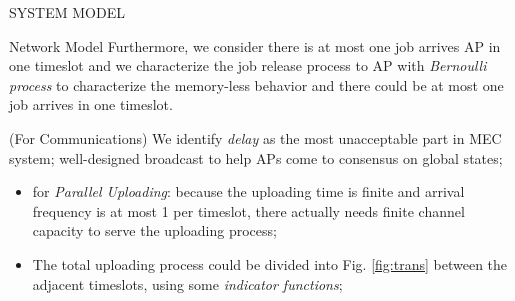 \documentclass[10pt, conference, letterpaper]{IEEEtran}
\begin{document}
\begin{section}{SYSTEM MODEL}
\begin{subsection}{Network Model}
            Furthermore, we consider there is at most one job arrives AP in one timeslot and we characterize the job release process to AP with \emph{Bernoulli process} to characterize the memory-less behavior and there could be at most one job arrives in one timeslot.

            (For Communications) We identify \emph{delay} as the most unacceptable part in MEC system; well-designed broadcast to help APs come to consensus on global states;
            \begin{itemize}
                \item for \emph{Parallel Uploading}: because the uploading time is finite and arrival frequency is at most 1 per timeslot, there actually needs finite channel capacity to serve the uploading process;
                \item The total uploading process could be divided into Fig. \ref{fig:trans} between the adjacent timeslots, using some \emph{indicator functions};
            \end{itemize}


\end{subsection}
\end{section}
\end{document}
